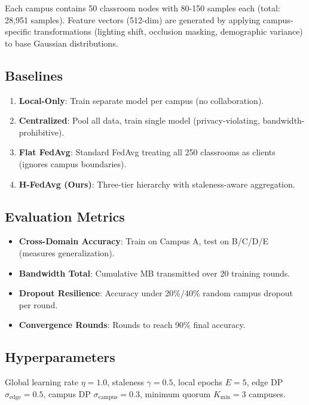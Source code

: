 \documentclass[conference]{IEEEtran}
\begin{document}
Each campus contains 50 classroom nodes with 80-150 samples each (total: 28,951 samples). Feature vectors (512-dim) are generated by applying campus-specific transformations (lighting shift, occlusion masking, demographic variance) to base Gaussian distributions.

\subsection{Baselines}

\begin{enumerate}
    \item \textbf{Local-Only}: Train separate model per campus (no collaboration).
    \item \textbf{Centralized}: Pool all data, train single model (privacy-violating, bandwidth-prohibitive).
    \item \textbf{Flat FedAvg}: Standard FedAvg treating all 250 classrooms as clients (ignores campus boundaries).
    \item \textbf{H-FedAvg (Ours)}: Three-tier hierarchy with staleness-aware aggregation.
\end{enumerate}

\subsection{Evaluation Metrics}

\begin{itemize}
    \item \textbf{Cross-Domain Accuracy}: Train on Campus A, test on B/C/D/E (measures generalization).
    \item \textbf{Bandwidth Total}: Cumulative MB transmitted over 20 training rounds.
    \item \textbf{Dropout Resilience}: Accuracy under 20\%/40\% random campus dropout per round.
    \item \textbf{Convergence Rounds}: Rounds to reach 90\% final accuracy.
\end{itemize}

\subsection{Hyperparameters}

Global learning rate $\eta = 1.0$, staleness $\gamma = 0.5$, local epochs $E = 5$, edge DP $\sigma_{\text{edge}} = 0.5$, campus DP $\sigma_{\text{campus}} = 0.3$, minimum quorum $K_{\min} = 3$ campuses.
\end{document}
